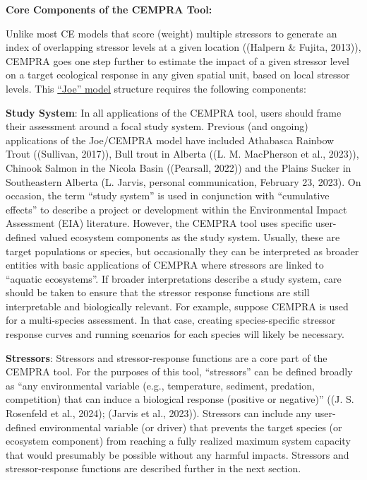 \documentclass[
  letterpaper,
  DIV=11,
  numbers=noendperiod]{scrreprt}
\begin{document}
\textbf{Core Components of the CEMPRA Tool:}

Unlike most CE models that score (weight) multiple stressors to generate
an index of overlapping stressor levels at a given location ((Halpern \&
Fujita, 2013)), CEMPRA goes one step further to estimate the impact of a
given stressor level on a target ecological response in any given
spatial unit, based on local stressor levels. This
\href{03_pathways_endpoints.qmd}{``Joe'' model} structure requires the
following components:

\textbf{Study System}: In all applications of the CEMPRA tool, users
should frame their assessment around a focal study system. Previous (and
ongoing) applications of the Joe/CEMPRA model have included Athabasca
Rainbow Trout ((Sullivan, 2017)), Bull trout in Alberta ((L. M.
MacPherson et al., 2023)), Chinook Salmon in the Nicola Basin
((Pearsall, 2022)) and the Plains Sucker in Southeastern Alberta (L.
Jarvis, personal communication, February 23, 2023). On occasion, the
term ``study system'' is used in conjunction with ``cumulative effects''
to describe a project or development within the Environmental Impact
Assessment (EIA) literature. However, the CEMPRA tool uses specific
user-defined valued ecosystem components as the study system. Usually,
these are target populations or species, but occasionally they can be
interpreted as broader entities with basic applications of CEMPRA where
stressors are linked to ``aquatic ecosystems''. If broader
interpretations describe a study system, care should be taken to ensure
that the stressor response functions are still interpretable and
biologically relevant. For example, suppose CEMPRA is used for a
multi-species assessment. In that case, creating species-specific
stressor response curves and running scenarios for each species will
likely be necessary.

\textbf{Stressors}: Stressors and stressor-response functions are a core
part of the CEMPRA tool. For the purposes of this tool, ``stressors''
can be defined broadly as ``any environmental variable (e.g.,
temperature, sediment, predation, competition) that can induce a
biological response (positive or negative)'' ((J. S. Rosenfeld et al.,
2024); (Jarvis et al., 2023)). Stressors can include any user-defined
environmental variable (or driver) that prevents the target species (or
ecosystem component) from reaching a fully realized maximum system
capacity that would presumably be possible without any harmful impacts.
Stressors and stressor-response functions are described further in the
next section.
\end{document}
